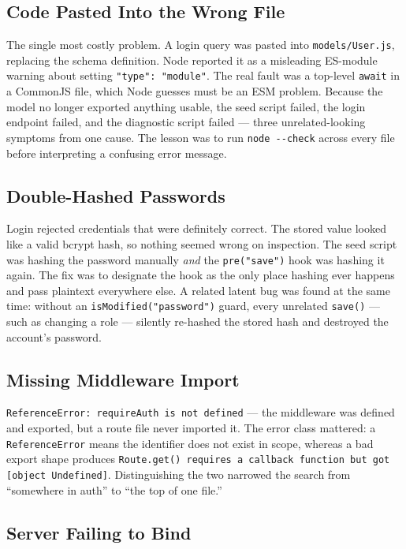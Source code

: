 \documentclass[11pt,letterpaper]{article}
\begin{document}
\subsection{Code Pasted Into the Wrong File}

The single most costly problem. A login query was pasted into
\texttt{models/User.js}, replacing the schema definition. Node reported it as
a misleading ES-module warning about setting \texttt{"type": "module"}. The
real fault was a top-level \texttt{await} in a CommonJS file, which Node
guesses must be an ESM problem. Because the model no longer exported anything
usable, the seed script failed, the login endpoint failed, and the diagnostic
script failed --- three unrelated-looking symptoms from one cause. The lesson
was to run \texttt{node -{}-check} across every file before interpreting a
confusing error message.

\subsection{Double-Hashed Passwords}

Login rejected credentials that were definitely correct. The stored value
looked like a valid bcrypt hash, so nothing seemed wrong on inspection. The
seed script was hashing the password manually \textit{and} the
\texttt{pre("save")} hook was hashing it again. The fix was to designate the
hook as the only place hashing ever happens and pass plaintext everywhere
else. A related latent bug was found at the same time: without an
\texttt{isModified("password")} guard, every unrelated \texttt{save()} ---
such as changing a role --- silently re-hashed the stored hash and destroyed
the account's password.

\subsection{Missing Middleware Import}

\texttt{ReferenceError: requireAuth is not defined} --- the middleware was
defined and exported, but a route file never imported it. The error class
mattered: a \texttt{ReferenceError} means the identifier does not exist in
scope, whereas a bad export shape produces \texttt{Route.get() requires a
callback function but got [object Undefined]}. Distinguishing the two narrowed
the search from ``somewhere in auth'' to ``the top of one file.''

\subsection{Server Failing to Bind}
\end{document}
